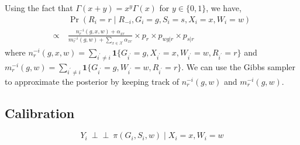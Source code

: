 \documentclass[11pt]{article}
\theoremstyle{plain}
\newcommand{\ind}{\mbox{$\perp\!\!\!\perp$}}
\newcommand\spacingset[1]{\renewcommand{\baselinestretch}%
  {#1}\small\normalsize}
\newcommand{\cX}{\mathcal{X}}
\begin{document}
Using the fact that $\Gamma(x+y)=x^y\Gamma(x)$ for $y \in \{0,1\}$, we
have,
\begin{align}
  & \Pr(R_i = r \mid R_{-i}, G_i = g, S_i = s, X_i = x, W_i = w) \\
  \propto \ &
              \frac{n_r^{-i}(g,x,w)+\alpha_{xr}}{m_r^{-i}(g,w)+\sum_{x
              \in \cX}\alpha_{xr}} \times p_r \times p_{wg|r}
              \times p_{s|r}
\end{align}
where
$n_r^{-i}(g,x,w) = \sum_{i^\prime\ne i} \mathbf{1}\{G_{i^\prime} = g,
X_{i^\prime} = x, W_{i^\prime} = w, R_{i^\prime} = r\}$ and
$m_r^{-i}(g,w)=\sum_{i^\prime\ne i} \mathbf{1}\{G_{i^\prime} = g,
W_{i^\prime} = w, R_{i^\prime} = r\}$.  We can use the Gibbs sampler
to approximate the posterior by keeping track of $n_r^{-i}(g,w)$ and
$m_r^{-i}(g,w)$.

\subsection{Calibration}

\begin{equation}
  Y_i \ \ind \ \pi(G_i, S_i, w) \mid X_i = x, W_i = w
\end{equation}

\spacingset{1.5}

\end{document}
